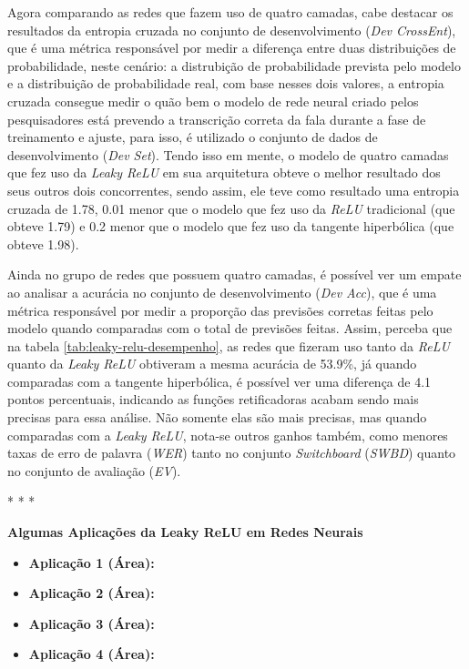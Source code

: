\begin{table}[ht]
\begin{threeparttable}
    \end{threeparttable}
\end{table}

Agora comparando as redes que fazem uso de quatro camadas, cabe destacar os resultados da entropia cruzada no conjunto de desenvolvimento (\textit{Dev CrossEnt}), que é uma métrica responsável por medir a diferença entre duas distribuições de probabilidade, neste cenário: a distrubição de probabilidade prevista pelo modelo e a distribuição de probabilidade real, com base nesses dois valores, a entropia cruzada consegue medir o quão bem o modelo de rede neural criado pelos pesquisadores está prevendo a transcrição correta da fala durante a fase de treinamento e ajuste, para isso, é utilizado o conjunto de dados de desenvolvimento (\textit{Dev Set}). Tendo isso em mente, o modelo de quatro camadas que fez uso da \textit{Leaky ReLU} em sua arquitetura obteve o melhor resultado dos seus outros dois concorrentes, sendo assim, ele teve como resultado uma entropia cruzada de 1.78, 0.01 menor que o modelo que fez uso da \textit{ReLU} tradicional (que obteve 1.79) e 0.2 menor que o modelo que fez uso da tangente hiperbólica (que obteve 1.98).

Ainda no grupo de redes que possuem quatro camadas, é possível ver um empate ao analisar a acurácia no conjunto de desenvolvimento (\textit{Dev Acc}), que é uma métrica responsável por medir a proporção das previsões corretas feitas pelo modelo quando comparadas com o total de previsões feitas. Assim, perceba que na tabela \ref{tab:leaky-relu-desempenho}, as redes que fizeram uso tanto da \textit{ReLU} quanto da \textit{Leaky ReLU} obtiveram a mesma acurácia de 53.9\%, já quando comparadas com a tangente hiperbólica, é possível ver uma diferença de 4.1 pontos percentuais, indicando as funções retificadoras acabam sendo mais precisas para essa análise. Não somente elas são mais precisas, mas quando comparadas com a \textit{Leaky ReLU}, nota-se outros ganhos também, como menores taxas de erro de palavra (\textit{WER}) tanto no conjunto \textit{Switchboard} (\textit{SWBD}) quanto no conjunto de avaliação (\textit{EV}).

\medskip
\begin{center}
 * * *
\end{center}
\medskip

\textbf{Algumas Aplicações da Leaky ReLU em Redes Neurais} 
\vspace{1em}

\begin{itemize}
    \item \textbf{Aplicação 1 (Área):}
    \item \textbf{Aplicação 2 (Área):}
    \item \textbf{Aplicação 3 (Área):}
    \item \textbf{Aplicação 4 (Área):}
\end{itemize}

